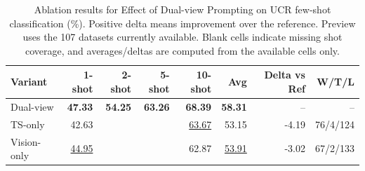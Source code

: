\begin{table}[t]
\centering
\caption{Ablation results for Effect of Dual-view Prompting on UCR few-shot classification (\%). Positive delta means improvement over the reference. Preview uses the 107 datasets currently available. Blank cells indicate missing shot coverage, and averages/deltas are computed from the available cells only.}
\label{tab:m2_dual_view_ablation_partial_preview-ablation-main}
\begin{tabular}{lrrrrrrr}
\toprule
Variant & 1-shot & 2-shot & 5-shot & 10-shot & Avg & Delta vs Ref & W/T/L \\
\midrule
Dual-view & \textbf{47.33} & \textbf{54.25} & \textbf{63.26} & \textbf{68.39} & \textbf{58.31} & -- & -- \\
TS-only & 42.63 &  &  & \underline{63.67} & 53.15 & -4.19 & 76/4/124 \\
Vision-only & \underline{44.95} &  &  & 62.87 & \underline{53.91} & -3.02 & 67/2/133 \\
\bottomrule
\end{tabular}
\end{table}
